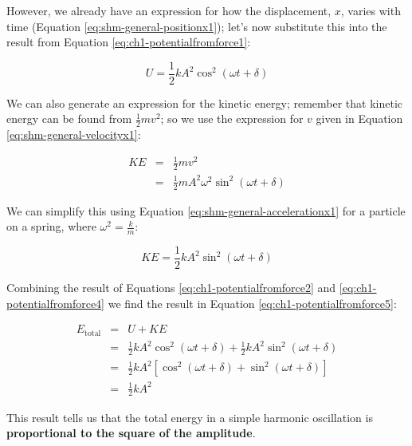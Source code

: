 \documentclass[
]{book}
\begin{document}
However, we already have an expression for how the displacement, \(x\), varies with time (Equation \eqref{eq:shm-general-positionx1}); let's now substitute this into the result from Equation \eqref{eq:ch1-potentialfromforce1}:

\begin{equation}
U = \frac{1}{2}kA^2 \cos^2 (\omega t + \delta)
\label{eq:ch1-potentialfromforce2}
\end{equation}

We can also generate an expression for the kinetic energy; remember that kinetic energy can be found from \(\frac{1}{2}mv^2\); so we use the expression for \(v\) given in Equation \eqref{eq:shm-general-velocityx1}:

\begin{equation}
\begin{array}{rcl}
KE &=& \frac{1}{2} mv^2 \\
& =& \frac{1}{2} m A^2 \omega^2 \sin^2 (\omega t + \delta)
\end{array}
\label{eq:ch1-potentialfromforce3}
\end{equation}

We can simplify this using Equation \eqref{eq:shm-general-accelerationx1} for a particle on a spring, where \(\omega^2 = \frac{k}{m}\):

\begin{equation}
KE = \frac{1}{2}kA^2 \sin^2 (\omega t + \delta)
\label{eq:ch1-potentialfromforce4}
\end{equation}

Combining the result of Equations \eqref{eq:ch1-potentialfromforce2} and \eqref{eq:ch1-potentialfromforce4} we find the result in Equation \eqref{eq:ch1-potentialfromforce5}:

\begin{equation}
\begin{array}{rcl}
E_\textrm{total} &=& U + KE \\
& =& \frac{1}{2}kA^2 \cos^2 (\omega t + \delta) + \frac{1}{2}kA^2 \sin^2 (\omega t + \delta)\\
& =& \frac{1}{2}kA^2 \left[ \cos^2 (\omega t + \delta) + \sin^2 (\omega t + \delta)\right]\\
&=& \frac{1}{2}kA^2
\end{array}
\label{eq:ch1-potentialfromforce5}
\end{equation}

This result tells us that the total energy in a simple harmonic oscillation is \textbf{proportional to the square of the amplitude}.
\end{document}
